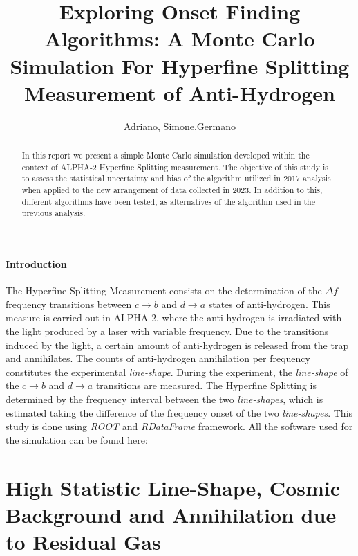\documentclass[11pt,a4paper,oneside]{article}
\title{%
 \vspace{-2.0cm}
 Exploring Onset Finding Algorithms: A Monte Carlo \\ Simulation For  Hyperfine Splitting Measurement of Anti-Hydrogen
}
\date{\vspace{-5ex}}
\author{Adriano, Simone,Germano }
\begin{document}

\maketitle
\begin{abstract}
\centering
In this report we present a simple Monte Carlo simulation developed within the context of ALPHA-2 Hyperfine Splitting measurement. The objective of this study is to assess the statistical uncertainty and bias of the algorithm utilized in 2017 analysis when applied to the new arrangement of data collected in 2023. In addition to this, different algorithms have been tested, as alternatives of the algorithm used in the previous analysis.
\end{abstract}

\paragraph{Introduction}

The Hyperfine Splitting Measurement consists on the determination of the $\Delta f$ frequency transitions between $c \rightarrow b$ and $ d \rightarrow a$ states of anti-hydrogen. This measure is carried out in ALPHA-2, where the anti-hydrogen is irradiated with the light produced by a laser with variable frequency. Due to the transitions induced by the light, a certain amount of anti-hydrogen is released from the trap and annihilates. The counts of anti-hydrogen annihilation per frequency constitutes the experimental \textit{line-shape}. During the experiment, the \textit{line-shape} of the $c \rightarrow b$ and $ d \rightarrow a$ transitions are measured. The Hyperfine Splitting is determined by the frequency interval between the two \textit{line-shapes}, which is estimated taking the difference of the frequency onset of the two \textit{line-shapes}. This study is done using \textit{ROOT} and \textit{RDataFrame} framework. All the software used for the simulation can be found here: {}

\section{High Statistic Line-Shape, Cosmic Background and Annihilation due to Residual Gas}
\end{document}
